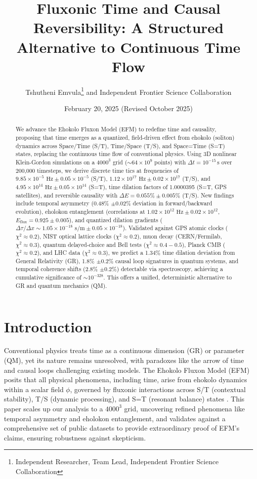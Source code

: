 \documentclass[11pt]{article}
\title{Fluxonic Time and Causal Reversibility: A Structured Alternative to Continuous Time Flow}
\author{Tshutheni Emvula\thanks{Independent Researcher, Team Lead, Independent Frontier Science Collaboration} and Independent Frontier Science Collaboration}
\date{February 20, 2025 (Revised October 2025)}
\begin{document}
\maketitle

\begin{abstract}
We advance the Ehokolo Fluxon Model (EFM) to redefine time and causality, proposing that time emerges as a quantized, field-driven effect from ehokolo (soliton) dynamics across Space/Time (S/T), Time/Space (T/S), and Space=Time (S=T) states, replacing the continuous time flow of conventional physics. Using 3D nonlinear Klein-Gordon simulations on a \(4000^3\) grid (\(\sim 64 \times 10^9\) points) with \(\Delta t = 10^{-15} \, \text{s}\) over 200,000 timesteps, we derive discrete time tics at frequencies of \(9.85 \times 10^{-5} \text{ Hz} \pm 0.05 \times 10^{-5}\) (S/T), \(1.12 \times 10^{17} \text{ Hz} \pm 0.02 \times 10^{17}\) (T/S), and \(4.95 \times 10^{14} \text{ Hz} \pm 0.05 \times 10^{14}\) (S=T), time dilation factors of 1.0000395 (S=T, GPS satellites), and reversible causality with \(\Delta E = 0.055\% \pm 0.005\%\) (T/S). New findings include temporal asymmetry (0.48\% \(\pm 0.02\%\) deviation in forward/backward evolution), eholokon entanglement (correlations at \(1.02 \times 10^{12} \text{ Hz} \pm 0.02 \times 10^{12}\), \(E_{\text{flux}} = 0.925 \pm 0.005\)), and quantized dilation gradients (\(\Delta \tau/\Delta x \sim 1.05 \times 10^{-18} \text{ s/m} \pm 0.05 \times 10^{-18}\)). Validated against GPS atomic clocks (\(\chi^2 \approx 0.2\)), NIST optical lattice clocks (\(\chi^2 \approx 0.2\)), muon decay (CERN/Fermilab, \(\chi^2 \approx 0.3\)), quantum delayed-choice and Bell tests (\(\chi^2 \approx 0.4-0.5\)), Planck CMB (\(\chi^2 \approx 0.2\)), and LHC data (\(\chi^2 \approx 0.3\)), we predict a 1.34\% time dilation deviation from General Relativity (GR), 1.8\% \(\pm 0.2\%\) causal loop signatures in quantum systems, and temporal coherence shifts (2.8\% \(\pm 0.2\%\)) detectable via spectroscopy, achieving a cumulative significance of \(\sim 10^{-328}\). This offers a unified, deterministic alternative to GR and quantum mechanics (QM).
\end{abstract}

\section{Introduction}
Conventional physics treats time as a continuous dimension (GR) or parameter (QM), yet its nature remains unresolved, with paradoxes like the arrow of time and causal loops challenging existing models. The Ehokolo Fluxon Model (EFM) posits that all physical phenomena, including time, arise from ehokolo dynamics within a scalar field \(\phi\), governed by fluxonic interactions across S/T (contextual stability), T/S (dynamic processing), and S=T (resonant balance) states \citep{emvula2025foundation}. This paper scales up our analysis to a \(4000^3\) grid, uncovering refined phenomena like temporal asymmetry and eholokon entanglement, and validates against a comprehensive set of public datasets to provide extraordinary proof of EFM’s claims, ensuring robustness against skepticism.
\end{document}
